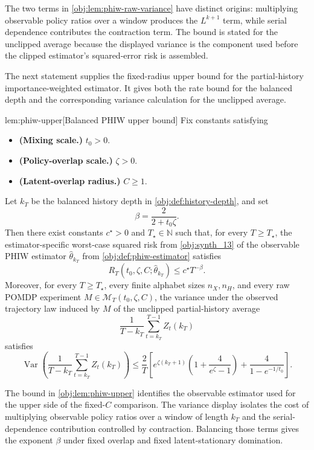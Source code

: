 The two terms in \cref{obj:lem:phiw-raw-variance} have distinct origins: multiplying observable policy ratios over a window produces the \(L^{k+1}\) term, while serial dependence contributes the contraction term. The bound is stated for the unclipped average because the displayed variance is the component used before the clipped estimator's squared-error risk is assembled.

The next statement supplies the fixed-radius upper bound for the partial-history importance-weighted estimator. It gives both the rate bound for the balanced depth and the corresponding variance calculation for the unclipped average.

\begin{lemmav}{lem:phiw-upper}[Balanced PHIW upper bound]
Fix constants satisfying
\begin{itemize}
\item \textbf{(Mixing scale.)} \(t_0>0\).
\item \textbf{(Policy-overlap scale.)} \(\zeta>0\).
\item \textbf{(Latent-overlap radius.)} \(C\ge 1\).
\end{itemize}
Let \(k_T\) be the balanced history depth in \cref{obj:def:history-depth}, and set
\[
\beta=\frac{2}{2+t_0\zeta}.
\]
Then there exist constants \(c^\star>0\) and \(T_\star\in\mathbb N\) such that, for every \(T\ge T_\star\), the estimator-specific worst-case squared risk from \cref{obj:synth_13} of the observable PHIW estimator \(\widehat\theta_{k_T}\) from \cref{obj:def:phiw-estimator} satisfies
\[
R_T(t_0,\zeta,C;\widehat\theta_{k_T})
\le
c^\star T^{-\beta}.
\]
Moreover, for every \(T\ge T_\star\), every finite alphabet sizes \(n_X,n_H\), and every raw POMDP experiment \(M\in\mathcal M_T(t_0,\zeta,C)\), the variance under the observed trajectory law induced by \(M\) of the unclipped partial-history average
\[
\frac{1}{T-k_T}\sum_{t=k_T}^{T-1} Z_t(k_T)
\]
satisfies
\[
\operatorname{Var}
\!\left(\frac{1}{T-k_T}\sum_{t=k_T}^{T-1} Z_t(k_T)\right)
\le
\frac{2}{T}
\left[
e^{\zeta(k_T+1)}
\left(1+\frac{4}{e^\zeta-1}\right)
+
\frac{4}{1-e^{-1/t_0}}
\right].
\]
\end{lemmav}

The bound in \cref{obj:lem:phiw-upper} identifies the observable estimator used for the upper side of the fixed-\(C\) comparison. The variance display isolates the cost of multiplying observable policy ratios over a window of length \(k_T\) and the serial-dependence contribution controlled by contraction. Balancing those terms gives the exponent \(\beta\) under fixed overlap and fixed latent-stationary domination.

